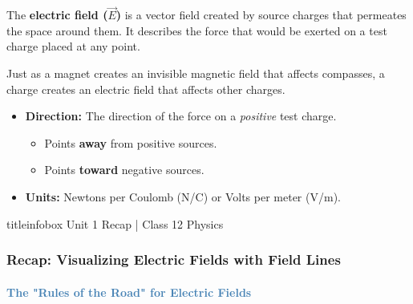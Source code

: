 \begin{frame}
\begin{frame}
\vspace{-0.05cm}

\begin{keybox}
\vspace{0.1cm}
The \textbf{electric field ($\vec{E}$)} is a vector field created by source charges that permeates the space around them. It describes the force that would be exerted on a test charge placed at any point.
\end{keybox}

\vspace{0.35cm}

\begin{examplebox}
\vspace{0.1cm}
Just as a magnet creates an invisible magnetic field that affects compasses, a charge creates an electric field that affects other charges.
\end{examplebox}

\vspace{0.35cm}

\begin{importantbox}
\vspace{0.1cm}
\begin{itemize}
    \item \textbf{Direction:} The direction of the force on a \textit{positive} test charge.
    \begin{itemize}
        \item Points \textbf{away} from positive sources.
        \item Points \textbf{toward} negative sources.
    \end{itemize}
    \item \textbf{Units:} Newtons per Coulomb (N/C) or Volts per meter (V/m).
\end{itemize}
\vspace{0.1cm}
\end{importantbox}

\vfill

\begin{beamercolorbox}[wd=\textwidth,ht=0.5cm,dp=0.1cm,center]{titleinfobox}
    \small\color{coolgray} Unit 1 Recap | Class 12 Physics
\end{beamercolorbox}
\end{frame}

\begin{frame}
\frametitle{\textsf{\textbf{Recap: Visualizing Electric Fields with Field Lines}}}
\framesubtitle{\textcolor{steelblue}{The "Rules of the Road" for Electric Fields}}


\end{frame}
\end{frame}
